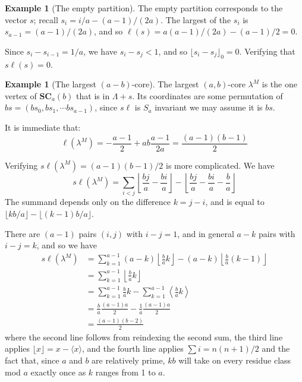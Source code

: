 \documentclass{amsart}[12pt]
\theoremstyle{definition}
\newtheorem{example}[dummy]{Example}
\newcommand{\SC}{\mathbf{SC}}
\newcommand{\sk}{s\ell}
\begin{document}
\begin{example}[The empty partition]
The empty partition corresponds to the vector $s$; recall $s_i=i/a-(a-1)/(2a)$.  
  The largest of the $s_i$ is $s_{a-1}=(a-1)/(2a)$, and so $\ell(s)=a(a-1)/(2a)-(a-1)/2=0$.  

Since $s_i-s_{i-1}=1/a$, we have $s_i-s_j<1$, and so $\lfloor s_i-s_j\rfloor_0=0$.  Verifying that $\sk(s)=0$.




\end{example}


\begin{example}[The largest $(a-b)$-core]

The largest $(a,b)$-core $\lambda^M$ is the one vertex of $\SC_a(b)$ that is in $\Lambda+s$.  Its coordinates are some permutation of
$bs=(bs_0,bs_1,\cdots bs_{a-1})$, since $\sk$ is $S_a$ invariant we may assume it is $bs$.  

It is immediate that:
$$\ell(\lambda^M)=-\frac{a-1}{2}+ab\frac{a-1}{2a}=\frac{(a-1)(b-1)}{2}$$

Verifying $\sk(\lambda^M)=(a-1)(b-1)/2$ is more complicated.  We have 
$$\sk(\lambda^M)=\sum_{i<j} \left\lfloor \frac{bj}{a}-\frac{bi}{a}\right\rfloor
-\left\lfloor \frac{bj}{a}-\frac{bi}{a}-\frac{b}{a}\right\rfloor$$
The summand depends only on the difference $k=j-i$, and is equal to $\lfloor kb/a\rfloor-\lfloor(k-1)b/a\rfloor$.

There are $(a-1)$ pairs $(i,j)$ with $i-j=1$, and in general $a-k$ pairs with $i-j=k$, and so we have
\begin{align*}
\sk(\lambda^M) &=\sum_{k=1}^{a-1}(a-k)\left\lfloor \frac{b}{a} k\right\rfloor-(a-k)\left\lfloor\frac{b}{a}(k-1)\right\rfloor \\
&=\sum_{k=1}^{a-1} \left\lfloor \frac{b}{a} k\right\rfloor \\
&=\sum_{k=1}^{a-1} \frac{b}{a}k-\sum_{k=1}^{a-1}\left\langle \frac{b}{a}k\right\rangle \\
&=\frac{b}{a} \frac{(a-1)a}{2}-\frac{1}{a}\frac{(a-1)a}{2} \\
&=\frac{(a-1)(b-2)}{2}
\end{align*}
where the second line follows from reindexing the second sum, the third line applies $\lfloor x\rfloor=x-\langle x\rangle$, and the fourth line applies $\sum i=n(n+1)/2$ and the fact that, since $a$ and $b$ are relatively prime, $kb$ will take on every residue class mod $a$ exactly once as $k$ ranges from 1 to $a$.

\end{example}
\end{document}
